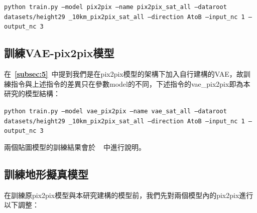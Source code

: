 \documentclass[a4paper, 12pt]{article}
\begin{document}
\begin{center}
    \texttt{\small python train.py --model pix2pix --name pix2pix\_sat\_all --dataroot datasets/height29 \_10km\_pix2pix\_sat\_all --direction AtoB --input\_nc 1 --output\_nc 3}
\end{center}


\subsection{訓練VAE-pix2pix模型}
在~\textbf{\ref{subsec:5}}~中提到我們是在pix2pix模型的架構下加入自行建構的VAE，故訓練指令與上述指令的差異只在參數model的不同，下述指令的vae\_pix2pix即為本研究的模型結構：

\begin{center}
    \texttt{\small python train.py --model vae\_pix2pix --name vae\_sat\_all --dataroot datasets/height29 \_10km\_pix2pix\_sat\_all --direction AtoB --input\_nc 1 --output\_nc 3}
\end{center}

兩個貼圖模型的訓練結果會於\textbf{~~}中進行說明。

\subsection{訓練地形擬真模型}
在訓練原pix2pix模型與本研究建構的模型前，我們先對兩個模型內的pix2pix進行以下調整：
\end{document}
